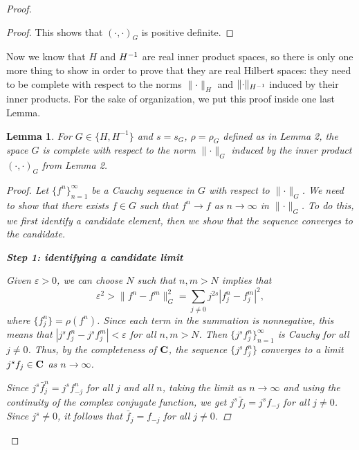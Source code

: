 \documentclass{homework}
\newtheorem{lemma}{Lemma}
\begin{document}
\begin{arabicparts}
\begin{proof}
\begin{proof}
			This shows that $(\cdot,\cdot)_G$ is positive definite.
		\end{proof}
		
		Now we know that $H$ and ${H^{-1}}$ are real inner product spaces, so there is only one more thing to show in order to prove that they are real Hilbert spaces: they need to be complete with respect to the norms $\lVert\cdot\rVert_H$ and $\lVert\cdot\rVert_{H^{-1}}$ induced by their inner products. For the sake of organization, we put this proof inside one last Lemma.
		
		\begin{lemma}
			For $G \in \{H,H^{-1}\}$ and $s = s_G$, $\rho = \rho_G$ defined as in Lemma 2, the space $G$ is complete with respect to the norm $\lVert\cdot\rVert_G$ induced by the inner product $(\cdot,\cdot)_G$ from Lemma 2.
			
			\begin{proof}
				Let $\{f^n\}_{n=1}^\infty$ be a Cauchy sequence in $G$ with respect to $\lVert \cdot \rVert_G$. We need to show that there exists $f\in G$ such that $f^n \to f$ as $n \to \infty$ in $\lVert \cdot\rVert_G$. To do this, we first identify a candidate element, then we show that the sequence converges to the candidate.
				
				\textbf{Step 1: identifying a candidate limit}
				
				Given $\varepsilon > 0$, we can choose $N$ such that $n,m > N$ implies that
				\begin{equation}
					\varepsilon^2 > \lVert f^n - f^m\rVert_G^2 = \sum_{j\ne0}j^{2s}|f^n_j - f^m_j|^2,
				\end{equation}
				where $\{f^n_j\} = \rho(f^n)$. Since each term in the summation is nonnegative, this means that $|j^sf^n_j - j^sf^m_j| < \varepsilon$ for all $n, m > N$. Then $\{j^sf^n_j\}_{n=1}^\infty$ is Cauchy for all $j \ne 0$. Thus, by the completeness of $\textbf{C}$, the sequence $\{j^sf^n_j\}$ converges to a limit $j^sf_j \in \textbf{C}$ as $n \to\infty$.
				
				\newcommand{\idx}{\mathcal{J}_J}
				Since $j^s\bar{f}^n_j = j^sf^n_{-j}$ for all $j$ and all $n$, taking the limit as $n \to \infty$ and using the continuity of the complex conjugate function, we get $j^s\bar{f}_j = j^sf_{-j}$ for all $j\ne0$. Since $j^s \ne 0$, it follows that $\bar{f}_j = f_{-j}$ for all $j\ne 0$.
				

\end{proof}
\end{lemma}
\end{proof}
\end{arabicparts}
\end{document}

